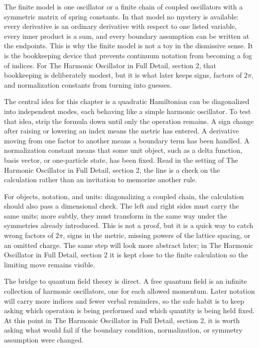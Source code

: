 The finite model is one oscillator or a finite chain of coupled oscillators with a symmetric matrix of spring constants.  In that model no mystery is available: every derivative is an ordinary derivative with respect to one listed variable, every inner product is a sum, and every boundary assumption can be written at the endpoints.  This is why the finite model is not a toy in the dismissive sense.  It is the bookkeeping device that prevents continuum notation from becoming a fog of indices.  For The Harmonic Oscillator in Full Detail, section 2, that bookkeeping is deliberately modest, but it is what later keeps signs, factors of \(2\pi\), and normalization constants from turning into guesses.

The central idea for this chapter is a quadratic Hamiltonian can be diagonalized into independent modes, each behaving like a simple harmonic oscillator.  To test that idea, strip the formula down until only the operation remains.  A sign change after raising or lowering an index means the metric has entered.  A derivative moving from one factor to another means a boundary term has been handled.  A normalization constant means that some unit object, such as a delta function, basis vector, or one-particle state, has been fixed.  Read in the setting of The Harmonic Oscillator in Full Detail, section 2, the line is a check on the calculation rather than an invitation to memorize another rule.

For objects, notation, and units: diagonalizing a coupled chain, the calculation should also pass a dimensional check.  The left and right sides must carry the same units; more subtly, they must transform in the same way under the symmetries already introduced.  This is not a proof, but it is a quick way to catch wrong factors of \(2\pi\), signs in the metric, missing powers of the lattice spacing, or an omitted charge.  The same step will look more abstract later; in The Harmonic Oscillator in Full Detail, section 2 it is kept close to the finite calculation so the limiting move remains visible.

The bridge to quantum field theory is direct.  A free quantum field is an infinite collection of harmonic oscillators, one for each allowed momentum.  Later notation will carry more indices and fewer verbal reminders, so the safe habit is to keep asking which operation is being performed and which quantity is being held fixed.  At this point in The Harmonic Oscillator in Full Detail, section 2, it is worth asking what would fail if the boundary condition, normalization, or symmetry assumption were changed.

